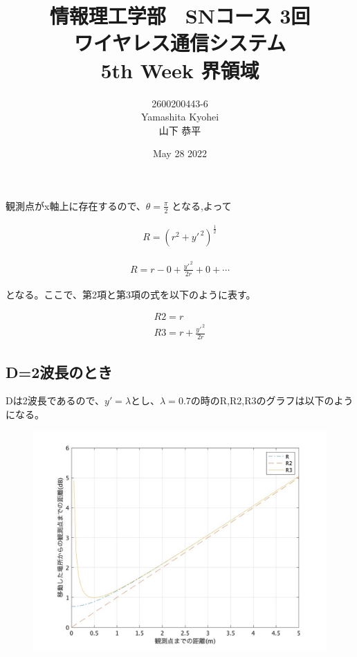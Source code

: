 \documentclass[dvipdfmx,autodetect-engine,titlepage]{jsarticle}
\title{情報理工学部　SNコース 3回\\
ワイヤレス通信システム\\
5th Week 界領域}
\author{2600200443-6\\Yamashita Kyohei\\山下 恭平}
\date{May 28 2022}
\begin{document}
\maketitle

\section{}
観測点がx軸上に存在するので、\begin{math} \theta = \frac{\pi}{2} \end{math}
となる,よって

\begin{align*}
  R = (r^2 + y'^{\,2})^{\frac{1}{2}}
\end{align*}

\begin{align*}
  R = r - 0 + \frac{y'^{\,2}}{2r} + 0 + \cdots
\end{align*}

となる。ここで、第2項と第3項の式を以下のように表す。

\begin{align*}
  R2 = r\\
  R3 = r + \frac{y'^{\,2}}{2r}
\end{align*}

\subsection{D=2波長のとき}

Dは2波長であるので、\begin{math} y'=\lambda\end{math}とし、\begin{math}
  \lambda = 0.7\end{math}の時のR,R2,R3のグラフは以下のようになる。

\begin{figure}[h]
  \centering
  \includegraphics[scale=0.3]{week4_1.jpg}
  \caption{}
\end{figure}
\end{document}
